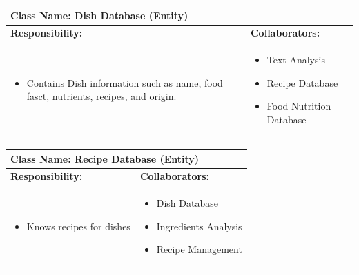 \documentclass[]{article}
\begin{document}
\begin{table}[H]
	\centering
	\begin{tabular}{|p{7cm}|p{7cm}|}
	\hline 
	 \multicolumn{2}{|l|}{\textbf{Class Name:} Dish Database (Entity) }\\
	\hline
	\textbf{Responsibility:} & \textbf{Collaborators:} \\
	\hline
	\raggedright
	\begin{itemize}
		\item Contains Dish information such as name, food fasct, nutrients, recipes, and origin.
	\end{itemize}
	\vspace{1in} & 
	\begin{itemize}
		\item Text Analysis
		\item Recipe Database
		\item Food Nutrition Database
	\end{itemize} \\
	\hline
	\end{tabular}
\end{table}

\begin{table}[H]
	\centering
	\begin{tabular}{|p{7cm}|p{7cm}|}
	\hline 
	 \multicolumn{2}{|l|}{\textbf{Class Name:} Recipe Database (Entity) }\\
	\hline
	\textbf{Responsibility:} & \textbf{Collaborators:} \\
	\hline
	\raggedright
	\begin{itemize}
		\item Knows recipes for dishes
	\end{itemize}
	\vspace{1in} & 
	\begin{itemize}
		\item Dish Database
		\item Ingredients Analysis
		\item Recipe Management
	\end{itemize} \\
	\hline
	\end{tabular}
\end{table}
\end{document}
